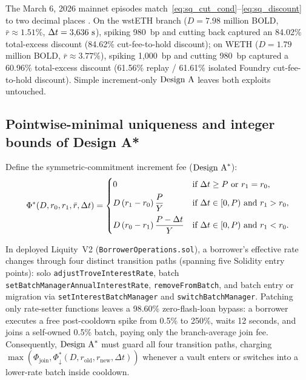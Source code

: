 The March 6, 2026 mainnet episodes match~\eqref{eq:sq_cut_cond}--\eqref{eq:sq_discount} to two decimal places \citep{companion2026}. On the wstETH branch ($D = 7.98$ million BOLD, $\bar{r} \approx 1.51\%$, $\Delta t = 3{,}636\textup{ s}$), spiking 980~bp and cutting back captured an 84.02\% total-excess discount (84.62\% cut-fee-to-hold discount); on WETH ($D = 1.79$ million BOLD, $\bar{r} \approx 3.77\%$), spiking 1,000~bp and cutting 980~bp captured a 60.96\% total-excess discount (61.56\% replay / 61.61\% isolated Foundry cut-fee-to-hold discount). Simple increment-only $\textup{Design A}$ leaves both exploits untouched.

\subsection{Pointwise-minimal uniqueness and integer bounds of Design A*}\label{subsec:design_astar}

Define the symmetric-commitment increment fee ($\textup{Design A}^*$):
\begin{equation}\label{eq:design_astar}
\Phi^*(D, r_0, r_1, \bar{r}, \Delta t) = \begin{cases}
0 & \textup{if } \Delta t \ge P \textup{ or } r_1 = r_0, \\[4pt]
D\,(r_1 - r_0)\,\dfrac{P}{Y} & \textup{if } \Delta t \in [0, P) \textup{ and } r_1 > r_0, \\[8pt]
D\,(r_0 - r_1)\,\dfrac{P - \Delta t}{Y} & \textup{if } \Delta t \in [0, P) \textup{ and } r_1 < r_0.
\end{cases}
\end{equation}

In deployed Liquity~V2 (\texttt{BorrowerOperations.sol}), a borrower's effective rate changes through four distinct transition paths (spanning five Solidity entry points): solo \texttt{adjustTrove\allowbreak InterestRate}, batch \texttt{setBatchManager\allowbreak AnnualInterestRate}, \texttt{removeFromBatch}, and batch entry or migration via \texttt{setInterest\allowbreak BatchManager} and \texttt{switchBatch\allowbreak Manager}. Patching only rate-setter functions leaves a 98.60\% zero-flash-loan bypass: a borrower executes a free post-cooldown spike from 0.5\% to 250\%, waits 12 seconds, and joins a self-owned 0.5\% batch, paying only the branch-average join fee. Consequently, $\textup{Design A}^*$ must guard all four transition paths, charging $\max(\Phi_{\mathrm{join}}, \Phi^*_\downarrow(D, r_{\mathrm{old}}, r_{\mathrm{new}}, \Delta t))$ whenever a vault enters or switches into a lower-rate batch inside cooldown.

